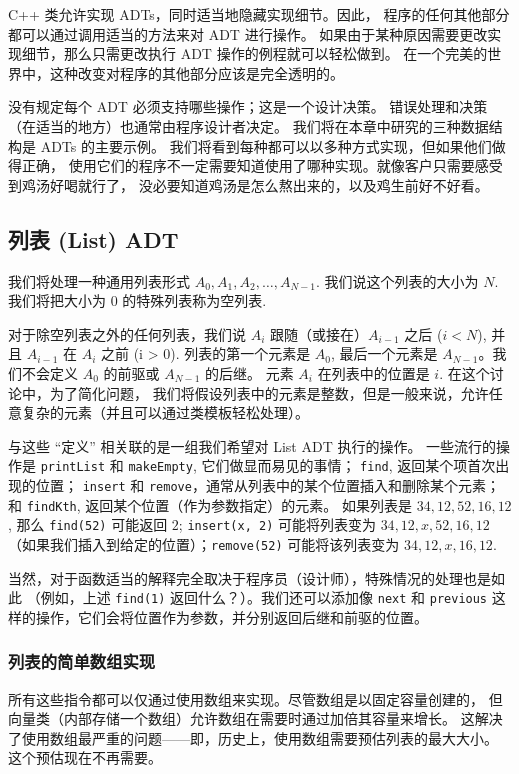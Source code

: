 \documentclass[a4paper]{ctexart}
\theoremstyle{definition}
\theoremstyle{definition}
\begin{document}
C++ 类允许实现 ADTs，同时适当地隐藏实现细节。因此，
程序的任何其他部分都可以通过调用适当的方法来对 ADT 进行操作。
如果由于某种原因需要更改实现细节，那么只需更改执行 ADT 操作的例程就可以轻松做到。
在一个完美的世界中，这种改变对程序的其他部分应该是完全透明的。

没有规定每个 ADT 必须支持哪些操作；这是一个设计决策。
错误处理和决策（在适当的地方）也通常由程序设计者决定。
我们将在本章中研究的三种数据结构是 ADTs 的主要示例。
我们将看到每种都可以以多种方式实现，但如果他们做得正确，
使用它们的程序不一定需要知道使用了哪种实现。就像客户只需要感受到鸡汤好喝就行了，
没必要知道鸡汤是怎么熬出来的，以及鸡生前好不好看。

\subsection{列表 (List) ADT}

我们将处理一种通用列表形式 $A_0, A_1, A_2 , \ldots, A_{N-1}$. 
我们说这个列表的大小为 $N$. 我们将把大小为 $0$ 的特殊列表称为空列表.

对于除空列表之外的任何列表，我们说 $A_i$ 跟随（或接在）$A_{i-1}$ 之后 ($i < N$), 
并且 $A_{i - 1}$ 在 $A_i$ 之前 (i > 0). 列表的第一个元素是 $A_0$, 
最后一个元素是 $A_{N-1}$。我们不会定义 $A_0$ 的前驱或 $A_{N-1}$ 的后继。
元素 $A_i$ 在列表中的位置是 $i$. 在这个讨论中，为了简化问题，
我们将假设列表中的元素是整数，但是一般来说，允许任意复杂的元素（并且可以通过类模板轻松处理）。

与这些 ``定义'' 相关联的是一组我们希望对 List ADT 执行的操作。
一些流行的操作是 \verb|printList| 和 \verb|makeEmpty|, 它们做显而易见的事情；
\verb|find|, 返回某个项首次出现的位置；
\verb|insert| 和 \verb|remove|，通常从列表中的某个位置插入和删除某个元素；
和 \verb|findKth|, 返回某个位置（作为参数指定）的元素。
如果列表是 $34, 12, 52, 16, 12$, 那么 \verb|find(52)| 可能返回 $2$; 
\verb|insert(x, 2)| 可能将列表变为 $34, 12, x, 52, 16, 12$
（如果我们插入到给定的位置）；\verb|remove(52)| 可能将该列表变为 $34, 12, x, 16, 12$.

当然，对于函数适当的解释完全取决于程序员（设计师），特殊情况的处理也是如此
（例如，上述 \verb|find(1)| 返回什么？）。我们还可以添加像 \verb|next| 和
\verb|previous| 这样的操作，它们会将位置作为参数，并分别返回后继和前驱的位置。

\subsubsection{列表的简单数组实现}
所有这些指令都可以仅通过使用数组来实现。尽管数组是以固定容量创建的，
但向量类（内部存储一个数组）允许数组在需要时通过加倍其容量来增长。
这解决了使用数组最严重的问题——即，历史上，使用数组需要预估列表的最大大小。
这个预估现在不再需要。
\end{document}
